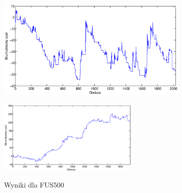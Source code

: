 \begin{figure}[h]
\begin{minipage}{.49\linewidth}
\centering
\includegraphics[width=0.82\textwidth]{images/S1d_fus500.eps}
\label{mansard}
\end{minipage}
\begin{minipage}{\linewidth}
\centering
\includegraphics[width=0.6\textwidth]{images/S1s_fus500.eps}
\label{mansard}
\end{minipage}
\caption{Wyniki dla FUS500}
\end{figure}
\FloatBarrier


